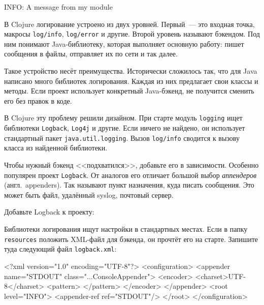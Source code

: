 \begin{english}
  \begin{text}
INFO: A message from my module
  \end{text}
\end{english}

В Clojure логирование устроено из двух уровней. Первый~--- это входная точка,
макросы \verb|log/info|, \verb|log/error| и другие. Второй уровень называют
бэкендом. Под ним понимают Java-библиотеку, которая выполняет основную работу:
пишет сообщения в файлы, отправляет их по сети и так далее.

Такое устройство несёт преимущества. Исторически сложилось так, что для Java
написано много библиотек логирования. Каждая из них предлагает свои классы и
методы. Если проект использует конкретный Java-бэкенд, не получится сменить его
без правок в коде.


В Clojure эту проблему решили дизайном. При старте модуль \verb|logging| ищет
библиотеки \verb|Logback|, \verb|Log4j| и другие. Если ничего не найдено, он
использует стандартный пакет \verb|java.util.logging|. Вызов \verb|log/info|
сводится к вызову класса из найденной библиотеки.

Чтобы нужный бэкенд <<подхватился>>, добавьте его в зависимости. Особенно
популярен проект \verb|Logback|. От аналогов его отличает большой выбор
\emph{аппендеров} (англ.~appenders). Так называют пункт назначения, куда писать
сообщения. Это может быть файл, удалённый syslog, почтовый сервер.

Добавьте Logback к проекту:

\begin{english}
  \begin{clojure}
  \end{clojure}
\end{english}


Библиотеки логирования ищут настройки в стандартных местах. Если в папку
\verb|resources| положить XML-файл для бэкенда, он прочтёт его на
старте. Запишите туда следующий файл \verb|logback.xml|:

\ifx\devicetype\mobile

\begin{english}
  \begin{xml}
<?xml version="1.0" encoding="UTF-8"?>
<configuration>
  <appender name="STDOUT"
    class="...ConsoleAppender">
    <encoder>
      <charset>UTF-8</charset>
      <pattern>
      </pattern>
    </encoder>
  </appender>
  <root level="INFO">
    <appender-ref ref="STDOUT"/>
  </root>
</configuration>
  \end{xml}
\end{english}

